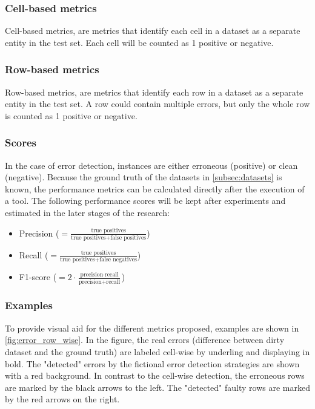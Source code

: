 \subsubsection{Cell-based metrics}
Cell-based metrics, are metrics that identify each cell in a dataset as a separate entity in the test set. Each cell will be counted as 1 positive or negative. 

\subsubsection{Row-based metrics}
Row-based metrics, are metrics that identify each row in a dataset as a separate entity in the test set. A row could contain multiple errors, but only the whole row is counted as 1 positive or negative.

\subsubsection{Scores}
In the case of error detection, instances are either erroneous (positive) or clean (negative). Because the ground truth of the datasets in \autoref{subsec:datasets} is known, the performance metrics can be calculated directly after the execution of a tool. 
The following performance scores will be kept after experiments and estimated in the later stages of the research:
\begin{itemize}
    \item Precision ($= \frac{\text{true positives}}{\text{true positives} + \text{false positives}}$)
    \item Recall ($= \frac{\text{true positives}}{\text{true positives} + \text{false negatives}}$)
    \item F1-score ($= 2 \cdot \frac{\text{precision} \cdot \text{recall}}{\text{precision} + \text{recall}}$)
\end{itemize}

\subsubsection{Examples}
To provide visual aid for the different metrics proposed, examples are shown in \autoref{fig:error_row_wise}. In the figure, the real errors (difference between dirty dataset and the ground truth) are labeled cell-wise by underling and displaying in bold. The "detected" errors by the fictional error detection strategies are shown with a red background. In contrast to the cell-wise detection, the erroneous rows are marked by the black arrows to the left. The "detected" faulty rows are marked by the red arrows on the right.


